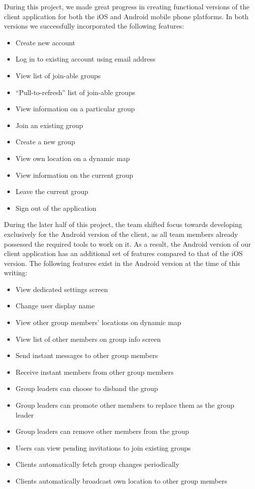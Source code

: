 During this project, we made great progress in creating functional versions of
the client application for both the iOS and Android mobile phone platforms.
In both versions we successfully incorporated the following features:

\begin{itemize}
	\item Create new account
	\item Log in to existing account using email address
	\item View list of join-able groups
	\item ``Pull-to-refresh'' list of join-able groups
	\item View information on a particular group
	\item Join an existing group
	\item Create a new group
	\item View own location on a dynamic map
	\item View information on the current group
	\item Leave the current group
	\item Sign out of the application
\end{itemize}

During the later half of this project, the team shifted focus towards developing
exclusively for the Android version of the client, as all team members already
possessed the required tools to work on it. As a result, the Android version of
our client application has an additional set of features compared to that of the
iOS version. The following features exist in the Android version at the time of
this writing:

\begin{itemize}
	\item View dedicated settings screen
	\item Change user display name
	\item View other group members' locations on dynamic map
	\item View list of other members on group info screen
	\item Send instant messages to other group members
	\item Receive instant members from other group members
	\item Group leaders can choose to disband the group
	\item Group leaders can promote other members to replace them as the group leader
	\item Group leaders can remove other members from the group
	\item Users can view pending invitations to join existing groups
	\item Clients automatically fetch group changes periodically
	\item Clients automatically broadcast own location to other group members
\end{itemize}

